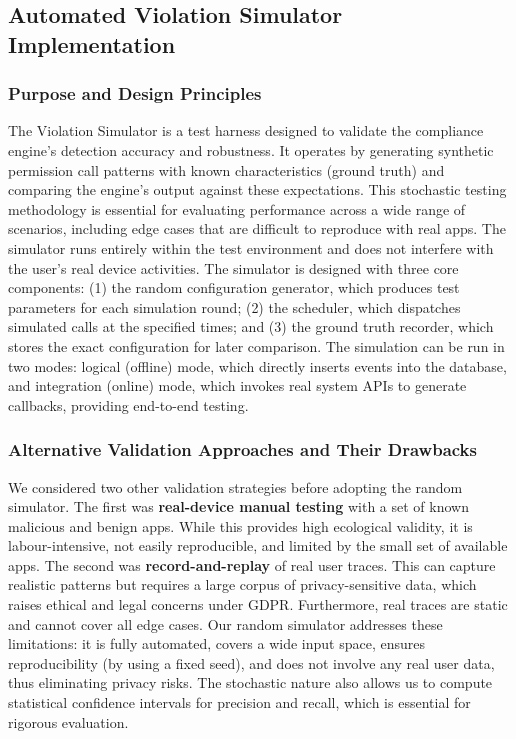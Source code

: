 \subsection{Automated Violation Simulator Implementation}

\subsubsection{Purpose and Design Principles}

The Violation Simulator is a test harness designed to validate the compliance engine's detection accuracy and robustness. It operates by generating synthetic permission call patterns with known characteristics (ground truth) and comparing the engine's output against these expectations. This stochastic testing methodology is essential for evaluating performance across a wide range of scenarios, including edge cases that are difficult to reproduce with real apps. The simulator runs entirely within the test environment and does not interfere with the user's real device activities. The simulator is designed with three core components: (1) the random configuration generator, which produces test parameters for each simulation round; (2) the scheduler, which dispatches simulated calls at the specified times; and (3) the ground truth recorder, which stores the exact configuration for later comparison. The simulation can be run in two modes: logical (offline) mode, which directly inserts events into the database, and integration (online) mode, which invokes real system APIs to generate callbacks, providing end-to-end testing.

\subsubsection{Alternative Validation Approaches and Their Drawbacks}

We considered two other validation strategies before adopting the random simulator. The first was \textbf{real-device manual testing} with a set of known malicious and benign apps. While this provides high ecological validity, it is labour-intensive, not easily reproducible, and limited by the small set of available apps. The second was \textbf{record-and-replay} of real user traces. This can capture realistic patterns but requires a large corpus of privacy-sensitive data, which raises ethical and legal concerns under GDPR. Furthermore, real traces are static and cannot cover all edge cases. Our random simulator addresses these limitations: it is fully automated, covers a wide input space, ensures reproducibility (by using a fixed seed), and does not involve any real user data, thus eliminating privacy risks. The stochastic nature also allows us to compute statistical confidence intervals for precision and recall, which is essential for rigorous evaluation.

